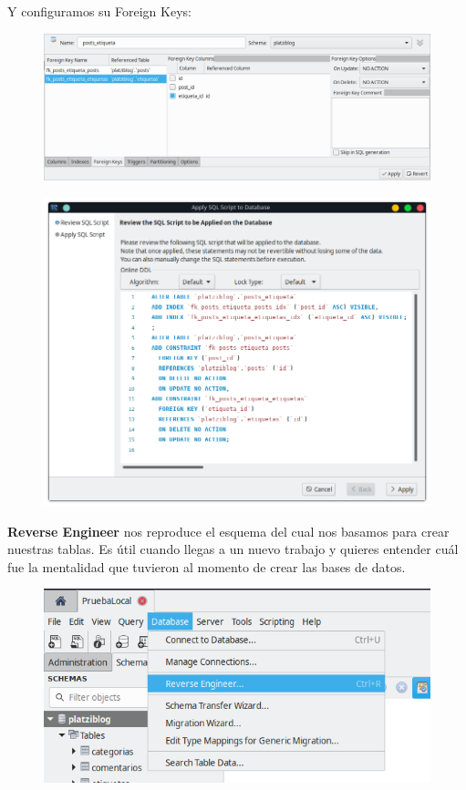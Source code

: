 \documentclass{article}
\begin{document}
Y configuramos su Foreign Keys:

\begin{figure}[h!]
  \centering
  \includegraphics[scale=0.55]{./Pictures/074_fk_pe_posts.png}
\end{figure}

\begin{figure}[h!]
  \centering
  \includegraphics[scale=0.55]{./Pictures/075_fk_confirm.png}
\end{figure}

\newpage
\textbf{Reverse Engineer} nos reproduce el esquema del cual nos basamos para
crear nuestras tablas. Es útil cuando llegas a un nuevo trabajo y quieres
entender cuál fue la mentalidad que tuvieron al momento de crear las bases de
datos.

\begin{figure}[h!]
  \centering
  \includegraphics[scale=0.55]{./Pictures/076_reverse_engineer.png}
\end{figure}
\end{document}
